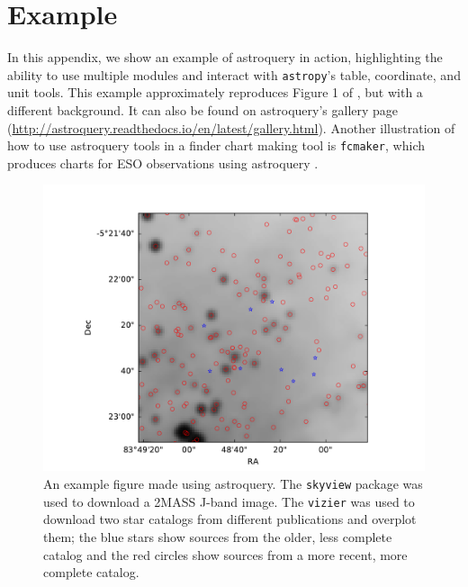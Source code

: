 \documentclass[twocolumn]{aastex62}
\newcommand{\package}[1]{\texttt{#1}\xspace}
\newcommand{\astropypkg}{\package{astropy}}
\begin{document}
\appendix
\section{Example}
\label{sec:example}
In this appendix, we show an example of astroquery in action, highlighting the
ability to use multiple modules and interact with \astropypkg's table, coordinate,
and unit tools.  This example approximately reproduces Figure 1 of
\citet{Eisner2016a}, but with a different background.  It can also be found on
astroquery's gallery page
(\url{http://astroquery.readthedocs.io/en/latest/gallery.html}).
Another illustration of how to use astroquery tools in a finder chart making
tool is \texttt{fcmaker}, which produces charts for ESO observations using
astroquery \citep{Vogt2018a}.


\newpage



\begin{figure}[!htp]
\includegraphics[scale=1,width=7in]{example_figure_1.pdf}
\caption{An example figure made using astroquery.  The \texttt{skyview} package
was used to download a 2MASS J-band image.  The \texttt{vizier} was used to
download two star catalogs from different publications and overplot them; the
blue stars show sources from the older, less complete catalog and the red
circles show sources from a more recent, more complete catalog.
}
\label{fig:example1}
\end{figure}
\end{document}
